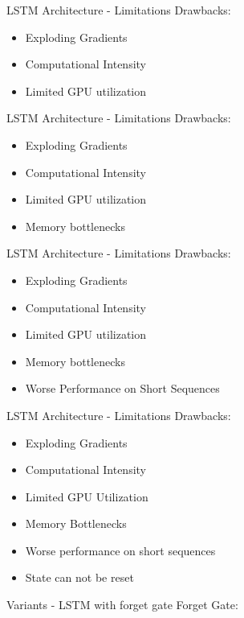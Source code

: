 \documentclass[10pt, aspectratio=169]{beamer}
\begin{document}
\begin{frame}[t]{LSTM Architecture - Limitations}
Drawbacks:
\begin{itemize}
    \item Exploding Gradients
    \item Computational Intensity
    \item Limited GPU utilization
\end{itemize}
\end{frame}

\begin{frame}[t]{LSTM Architecture - Limitations}
Drawbacks:
\begin{itemize}
    \item Exploding Gradients
    \item Computational Intensity
    \item Limited GPU utilization
    \item Memory bottlenecks
\end{itemize}
\end{frame}

\begin{frame}[t]{LSTM Architecture - Limitations}
Drawbacks:
\begin{itemize}
    \item Exploding Gradients
    \item Computational Intensity
    \item Limited GPU utilization
    \item Memory bottlenecks
    \item Worse Performance on Short Sequences
\end{itemize}
\end{frame}

\begin{frame}[t]{LSTM Architecture - Limitations}
Drawbacks:
\begin{itemize}
    \item Exploding Gradients
    \item Computational Intensity
    \item Limited GPU Utilization
    \item Memory Bottlenecks
    \item Worse performance on short sequences
    \item State can not be reset
\end{itemize}
\end{frame}


\begin{frame}[t]{Variants - LSTM with forget gate}
Forget Gate:
\end{frame}
\end{document}
